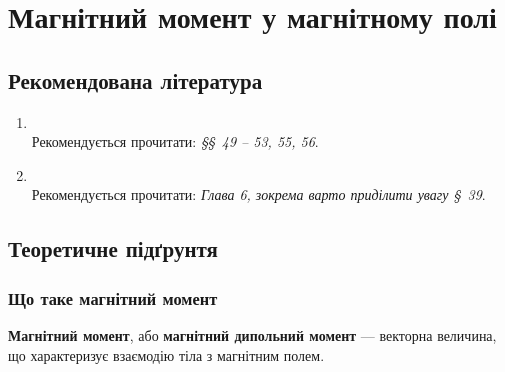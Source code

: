 \expandafter\graphicspath\expandafter{\expandafter{\currfilebase/pic}}


\keywords{}

\apparatus{}

\chapter{Магнітний момент у магнітному полі}
\makeworktitle

\section*{Рекомендована література }
\begin{enumerate}
	\item {}\\[0.5ex]
	      Рекомендується прочитати: \emph{\S\S~49 -- 53, 55, 56}.
	\item {}\\[0.5ex]
	      Рекомендується прочитати: \emph{Глава 6, зокрема варто приділити увагу \S~39}.
\end{enumerate}

\section{Теоретичне підґрунтя}
\subsection{Що таке магнітний момент}

\textbf{Магнітний момент}, або \textbf{магнітний дипольний момент} --- векторна величина, що характеризує взаємодію тіла з магнітним полем.

